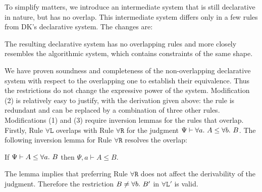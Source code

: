To simplify matters, we introduce an intermediate system that is still declarative
in nature, but has no overlap. This intermediate system differs only in a few 
rules from DK's declarative system. The changes are:
The resulting declarative system has no overlapping rules
and more closely resembles the algorithmic system,
which contains constraints of the same shape.

We have proven soundness and completeness of the non-overlapping declarative
system with respect to the overlapping one to establish their equivalence.
Thus the restrictions do not change the expressive power of the system.
Modification (2) is relatively easy to justify, with the derivation given above:
the rule is redundant and can be replaced by a combination of three other rules.
Modifications (1) and (3) require inversion lemmas for the rules that overlap.
Firstly, Rule $\mathtt{\forall L}$ overlaps with Rule $\mathtt{\forall R}$ for the judgment
$\Psi \vdash \all A \le \all[b]B$.
The following inversion lemma for Rule $\mathtt{\forall R}$ resolves the overlap:
\begin{lemma}\label{lem:inv_allR}
If $\Psi \vdash A \le \all B$ then $\Psi, a \vdash A \le B$.
\end{lemma}
The lemma implies that preferring Rule $\mathtt{\forall R}$ does not affect the derivability of the judgment.
Therefore the restriction $B \neq \all[b]B'$ in $\mathtt{\forall L'}$ is valid.


